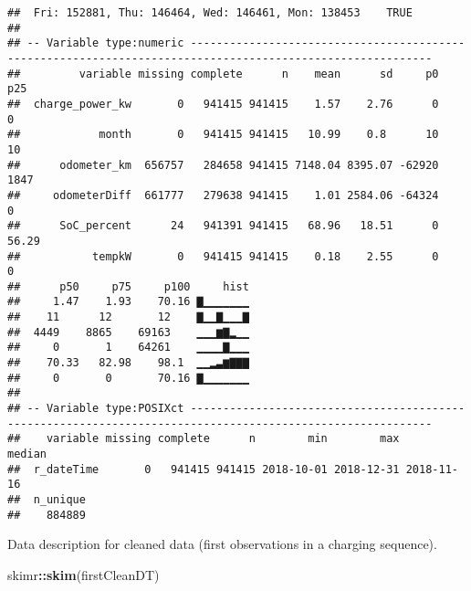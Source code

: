 \documentclass[]{article}
\newenvironment{Shaded}{\begin{snugshade}}{\end{snugshade}}
\newcommand{\KeywordTok}[1]{\textcolor[rgb]{0.13,0.29,0.53}{\textbf{#1}}}
\newcommand{\NormalTok}[1]{#1}
\newcommand{\OperatorTok}[1]{\textcolor[rgb]{0.81,0.36,0.00}{\textbf{#1}}}
\begin{document}
\begin{verbatim}
##  Fri: 152881, Thu: 146464, Wed: 146461, Mon: 138453    TRUE
## 
## -- Variable type:numeric -----------------------------------------------------------------------------------------------------------
##         variable missing complete      n    mean      sd     p0     p25
##  charge_power_kw       0   941415 941415    1.57    2.76      0    0   
##            month       0   941415 941415   10.99    0.8      10   10   
##      odometer_km  656757   284658 941415 7148.04 8395.07 -62920 1847   
##     odometerDiff  661777   279638 941415    1.01 2584.06 -64324    0   
##      SoC_percent      24   941391 941415   68.96   18.51      0   56.29
##           tempkW       0   941415 941415    0.18    2.55      0    0   
##      p50     p75     p100     hist
##     1.47    1.93    70.16 ▇▁▁▁▁▁▁▁
##    11      12       12    ▇▁▁▇▁▁▁▇
##  4449    8865    69163    ▁▁▁▆▇▂▁▁
##     0       1    64261    ▁▁▁▁▇▁▁▁
##    70.33   82.98    98.1  ▁▁▂▃▆▇▇▇
##     0       0       70.16 ▇▁▁▁▁▁▁▁
## 
## -- Variable type:POSIXct -----------------------------------------------------------------------------------------------------------
##    variable missing complete      n        min        max     median
##  r_dateTime       0   941415 941415 2018-10-01 2018-12-31 2018-11-16
##  n_unique
##    884889
\end{verbatim}

Data description for cleaned data (first observations in a charging sequence).

\begin{Shaded}
\begin{Highlighting}[]
\NormalTok{skimr}\OperatorTok{::}\KeywordTok{skim}\NormalTok{(firstCleanDT)}
\end{Highlighting}
\end{Shaded}
\end{document}
